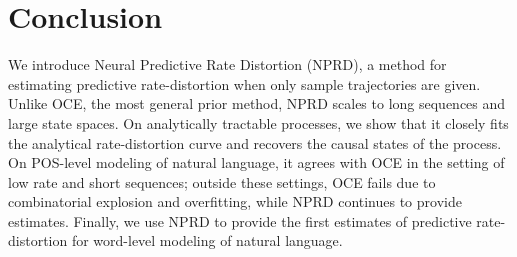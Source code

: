 \documentclass[11pt,letterpaper]{article}
\begin{document}
%
%
%
%
%
%
%
%


\section{Conclusion}
We introduce Neural Predictive Rate Distortion (NPRD), a method for estimating predictive rate-distortion when only sample trajectories are given.
Unlike OCE, the most general prior method, NPRD scales to long sequences and large state spaces.
On analytically tractable processes, we show that it closely fits the analytical rate-distortion curve and recovers the causal states of the process.
On POS-level modeling of natural language, it agrees with OCE in the setting of low rate and short sequences; outside these settings, OCE fails due to combinatorial explosion and overfitting, while NPRD continues to provide estimates.
Finally, we use NPRD to provide the first estimates of predictive rate-distortion for word-level modeling of natural language.



%

\end{document}
